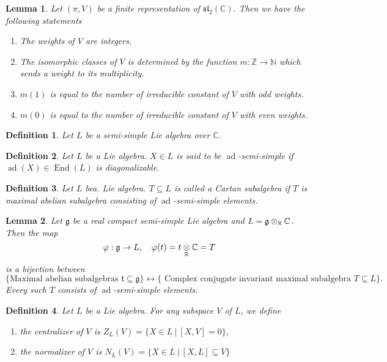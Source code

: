 \documentclass{article}
\newtheorem{definition}{Definition}[section]
\newtheorem{lemma}{Lemma}[section]
\numberwithin{equation}{section}
\DeclareMathOperator{\ad}{ad}
\DeclareMathOperator{\End}{End}
\newcommand{\tens}[1]{%
  \mathbin{\mathop{\otimes}\displaylimits_{#1}}%
}
\begin{document}
\begin{lemma}
Let $(\pi,V)$ be a finite representation of $\mathfrak{sl}_2(\mathbb{C})$. Then we have the following statements
\begin{enumerate}
\item The weights of $V$ are integers.
\item The isomorphic classes of $V$ is determined by the function $m:\mathbb{Z}\to \mathbb{N}$ which sends a weight to its multiplicity.
\item $m(1)$ is equal to the number of irreducible constant of $V$ with odd weights.
\item $m(0)$ is equal to the number of irreducible constant of $V$ with even weights.
\end{enumerate}
\end{lemma}

\begin{definition}
Let $L$ be a semi-simple Lie algebra over $\mathbb{C}$. %
\end{definition}

\begin{definition}
Let $L$ be a Lie algebra. $X\in L$ is said to be $\ad$-semi-simple if $\ad(X)\in\End(L)$ is diagonalizable. 
\end{definition}

\begin{definition}
Let $L$ bea. Lie algebra. $T\subseteq L$ is called a Cartan subalgebra if $T$ is maximal abelian subalgebra consisting of $\ad$-semi-simple elements.
\end{definition}

\begin{lemma}
Let $\mathfrak{g}$ be a real compact semi-simple Lie algebra and $L=\mathfrak{g}\tens{\mathbb{R}}\mathbb{C}$. Then the map
\begin{equation*}
\varphi:\mathfrak{g}\to L,\quad \varphi(t) = t\tens{\mathbb{R}}\mathbb{C}=T
\end{equation*}
is a bijection between
\begin{equation*}
\{\text{Maximal abelian subalgebras }\mathfrak{t}\subseteq\mathfrak{g}\}\leftrightarrow \{\text{ Complex conjugate invariant maximal subalgebra }T\subseteq L\}.
\end{equation*}
Every such $T$ consists of $\ad$-semi-simple elements.
\end{lemma}

\begin{definition}
Let $L$ be a Lie algebra. For any subspace $V$ of $L$, we define
\begin{enumerate}
\item the centralizer of $V$ is $Z_L(V)=\{X\in L\:|\: [X,V] = 0\}$,
\item the normalizer of $V$ is $N_L(V)=\{X\in L\:|\: [X,L]\subseteq V\}$
\end{enumerate}
\end{definition}
\end{document}
